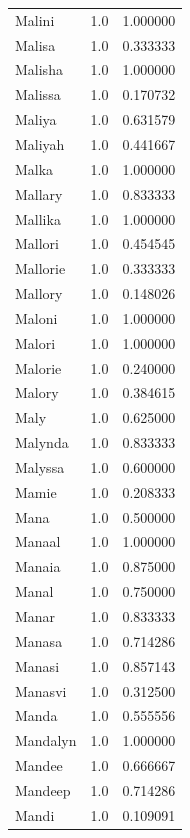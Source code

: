 \documentclass[
  letterpaper,
  DIV=11,
  numbers=noendperiod]{scrreprt}
\begin{document}
\begin{tabular}{lrr}
Malini          &   1.0 &   1.000000 \\
Malisa          &   1.0 &   0.333333 \\
Malisha         &   1.0 &   1.000000 \\
Malissa         &   1.0 &   0.170732 \\
Maliya          &   1.0 &   0.631579 \\
Maliyah         &   1.0 &   0.441667 \\
Malka           &   1.0 &   1.000000 \\
Mallary         &   1.0 &   0.833333 \\
Mallika         &   1.0 &   1.000000 \\
Mallori         &   1.0 &   0.454545 \\
Mallorie        &   1.0 &   0.333333 \\
Mallory         &   1.0 &   0.148026 \\
Maloni          &   1.0 &   1.000000 \\
Malori          &   1.0 &   1.000000 \\
Malorie         &   1.0 &   0.240000 \\
Malory          &   1.0 &   0.384615 \\
Maly            &   1.0 &   0.625000 \\
Malynda         &   1.0 &   0.833333 \\
Malyssa         &   1.0 &   0.600000 \\
Mamie           &   1.0 &   0.208333 \\
Mana            &   1.0 &   0.500000 \\
Manaal          &   1.0 &   1.000000 \\
Manaia          &   1.0 &   0.875000 \\
Manal           &   1.0 &   0.750000 \\
Manar           &   1.0 &   0.833333 \\
Manasa          &   1.0 &   0.714286 \\
Manasi          &   1.0 &   0.857143 \\
Manasvi         &   1.0 &   0.312500 \\
Manda           &   1.0 &   0.555556 \\
Mandalyn        &   1.0 &   1.000000 \\
Mandee          &   1.0 &   0.666667 \\
Mandeep         &   1.0 &   0.714286 \\
Mandi           &   1.0 &   0.109091 \\

\end{tabular}
\end{document}
